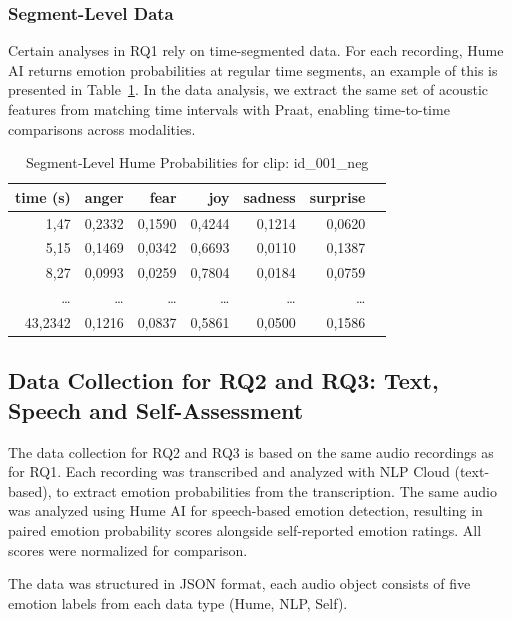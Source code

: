 \subsubsection{Segment-Level Data}
Certain analyses in RQ1 rely on time-segmented data. For each recording, Hume AI returns emotion probabilities at regular time segments, an example of this is presented in Table~\ref{tab:segments_hume_example}. 
In the data analysis, we extract the same set of acoustic features from matching time intervals with Praat, enabling time-to-time comparisons across modalities.
\begin{table}[H]
    \centering
    
    \begin{tabular}{rrrrrrl}
      \toprule
      \textbf{time (s)} & \textbf{anger} & \textbf{fear} & \textbf{joy} & \textbf{sadness} & \textbf{surprise} \\
      \midrule
      1,47    & 0,2332  & 0,1590 & 0,4244 & 0,1214 & 0,0620 \\
      5,15    & 0,1469  & 0,0342 & 0,6693 & 0,0110 & 0,1387 \\
      8,27    & 0,0993  & 0,0259 & 0,7804 & 0,0184 & 0,0759 \\
      \dots   & \dots   & \dots  & \dots  & \dots  & \dots  \\
      43,2342 & 0,1216  & 0,0837 & 0,5861 & 0,0500 & 0,1586 \\
      \bottomrule
    \end{tabular}
    \caption{Segment‐Level Hume Probabilities for clip: id\_001\_neg}
    \label{tab:segments_hume_example}
  \end{table}
  

\subsection{Data Collection for RQ2 and RQ3: Text, Speech and Self-Assessment}
\label{sec:datacoll_rq2_rq3}


The data collection for RQ2 and RQ3 is based on the same audio recordings as for RQ1. 
Each recording was transcribed and analyzed with NLP Cloud (text-based), to extract emotion probabilities from the transcription. The same audio was analyzed using Hume AI for speech-based emotion detection, resulting in paired emotion probability scores alongside self-reported emotion ratings. All scores were normalized for comparison.

The data was structured in JSON format, each audio object consists of five emotion labels from each data type (Hume, NLP, Self). 


